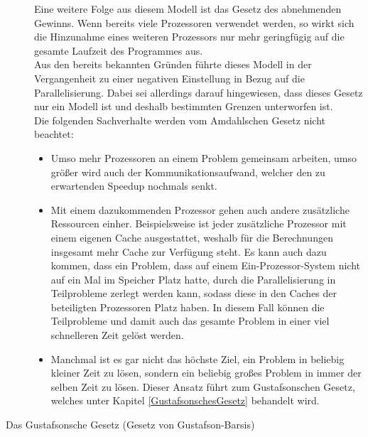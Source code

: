 \begin{description}
					Eine weitere Folge aus diesem Modell ist das Gesetz des abnehmenden Gewinns. Wenn bereits viele Prozessoren verwendet werden, so wirkt sich die Hinzunahme eines weiteren Prozessors nur mehr geringfügig auf die gesamte Laufzeit des Programmes aus.\\
					
					Aus den bereits bekannten Gründen führte dieses Modell in der Vergangenheit zu einer negativen Einstellung in Bezug auf die Parallelisierung. Dabei sei allerdings darauf hingewiesen, dass dieses Gesetz nur ein Modell ist und deshalb bestimmten Grenzen unterworfen ist.\\
					Die folgenden Sachverhalte werden vom Amdahlschen Gesetz nicht beachtet:
					
					\begin{itemize}
						\item Umso mehr Prozessoren an einem Problem gemeinsam arbeiten, umso größer wird auch der Kommunikationsaufwand, welcher den zu erwartenden Speedup nochmals senkt.
						\item Mit einem dazukommenden Prozessor gehen auch andere zusätzliche Ressourcen einher. Beispielsweise ist jeder zusätzliche Prozessor mit einem eigenen Cache ausgestattet, weshalb für die Berechnungen insgesamt mehr Cache zur Verfügung steht. Es kann auch dazu kommen, dass ein Problem, dass auf einem Ein-Prozessor-System nicht auf ein Mal im Speicher Platz hatte, durch die Parallelisierung in Teilprobleme zerlegt werden kann, sodass diese in den Caches der beteiligten Prozessoren Platz haben. In diesem Fall können die Teilprobleme und damit auch das gesamte Problem in einer viel schnelleren Zeit gelöst werden.
						\item Manchmal ist es gar nicht das höchste Ziel, ein Problem in beliebig kleiner Zeit zu lösen, sondern ein beliebig großes Problem in immer der selben Zeit zu lösen. Dieser Ansatz führt zum Gustafsonschen Gesetz, welches unter Kapitel \ref{GustafsonschesGesetz} behandelt wird. \cite{AmdahlschesGesetzWikipedia} \cite{GesetzeParallelierung}
					\end{itemize}

				\item [Das Gustafsonsche Gesetz (Gesetz von Gustafson-Barsis)]
					\label{GustafsonschesGesetz}
					

\end{description}
